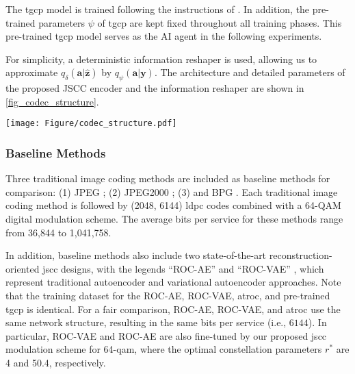 The \gls{tgcp} model is trained following the instructions of \cite{Wu_2022_TgC}. In addition, the pre-trained parameters $\psi$ of \gls{tgcp} are kept fixed throughout all training phases. This pre-trained \gls{tgcp} model serves as the AI agent in the following experiments.

For simplicity, a deterministic information reshaper is used, allowing us to approximate $q_{\delta}(\bm{a}|\hat{\bm{z}})$ by $q_{\psi}(\bm{a}|\bm{y})$. The architecture and detailed parameters of the proposed JSCC encoder and the information reshaper are shown in \cref{fig_codec_structure}.

\begin{figure*}[t]
    \begin{center}
    \texttt{[image: Figure/codec\_structure.pdf]}
    \end{center}
       \caption{Architecture of the proposed JSCC encoder and information reshaper. For example, \textit{ConvC 3-1} represents a convolutional layer with \(C\) channels, a \(3\times3\) kernel size, and padding of 1 on both sides. \(\downarrow\)2 denotes the strided down convolutions, while NN\(\uparrow\)2 denotes the nearest neighbor upsampling. \textit{FC2048} refers to a fully connected layer with an output size of 2048. \textit{BatchNorm} denotes batch normalization, \textit{LReLU} represents the leaky ReLU activation with \(\alpha=0.2\), and \(\Omega\) represents the batch size. The dimensions (number of channels) of the inputs and outputs for the \textit{ResBlock} remain unchanged.}
    \label{fig_codec_structure}
\end{figure*}

\subsubsection{Baseline Methods}
Three traditional image coding methods are included as baseline methods for comparison: (1) JPEG \cite{Wallace_1992_TJs}; (2) JPEG2000 \cite{Taubman_2002_JIc}; (3) and BPG \cite{BPG}. Each traditional image coding method is followed by (2048, 6144) \gls{ldpc} codes combined with a 64-QAM digital modulation scheme. The average bits per service for these methods range from 36,844 to 1,041,758. 

In addition, baseline methods also include two state-of-the-art reconstruction-oriented \gls{jscc} designs, with the legends ``ROC-AE'' \cite{Bourtsoulatze_2019_DJS} and ``ROC-VAE'' \cite{Saidutta_2021_JSC}, which represent traditional autoencoder and variational autoencoder approaches. Note that the training dataset for the ROC-AE, ROC-VAE, \gls{atroc}, and pre-trained \gls{tgcp} is identical. For a fair comparison, ROC-AE, ROC-VAE, and \gls{atroc} use the same network structure, resulting in the same bits per service (i.e., $6144$).
In particular, ROC-VAE and ROC-AE are also fine-tuned by our proposed \gls{jscc} modulation scheme for 64-\gls{qam}, where the optimal constellation parameters $r^*$ are 4 and 50.4, respectively.

